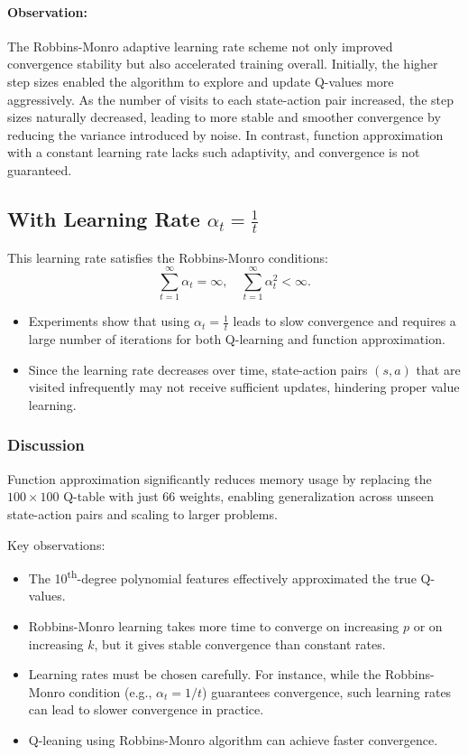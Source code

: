 \documentclass[10pt,twocolumn,letterpaper]{article}
\begin{document}
\paragraph{Observation:}

The Robbins-Monro adaptive learning rate scheme not only improved convergence stability but also accelerated training overall. Initially, the higher step sizes enabled the algorithm to explore and update Q-values more aggressively. As the number of visits to each state-action pair increased, the step sizes naturally decreased, leading to more stable and smoother convergence by reducing the variance introduced by noise. In contrast, function approximation with a constant learning rate lacks such adaptivity, and convergence is not guaranteed.

\subsection*{With Learning Rate \(\alpha_t = \frac{1}{t}\)}

This learning rate satisfies the Robbins-Monro conditions:
\[
\sum_{t=1}^\infty \alpha_t = \infty, \quad \sum_{t=1}^\infty \alpha_t^2 < \infty.
\]

\begin{itemize}
    \item Experiments show that using \(\alpha_t = \frac{1}{t}\) leads to slow convergence and requires a large number of iterations for both Q-learning and function approximation.
    \item Since the learning rate decreases over time, state-action pairs \((s,a)\) that are visited infrequently may not receive sufficient updates, hindering proper value learning.
\end{itemize}


\subsubsection*{Discussion}

Function approximation significantly reduces memory usage by replacing the $100 \times 100$ Q-table with just 66 weights, enabling generalization across unseen state-action pairs and scaling to larger problems.

Key observations:
\begin{itemize}
    \item The 10\textsuperscript{th}-degree polynomial features effectively approximated the true Q-values.
    \item Robbins-Monro learning takes more time to converge on increasing $p$ or on increasing $k$, but it gives stable convergence than constant rates.
    \item Learning rates must be chosen carefully. For instance, while the Robbins-Monro condition (e.g., $\alpha_t = 1/t$) guarantees convergence, such learning rates can lead to slower convergence in practice.
    \item Q-leaning using Robbins-Monro algorithm can achieve faster convergence. 
    
\end{itemize}
\end{document}
